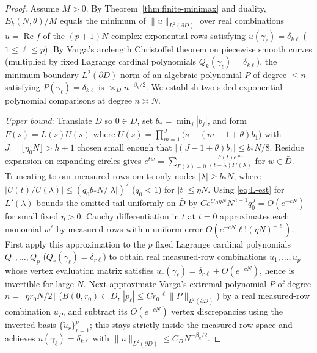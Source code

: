 \documentclass[11pt,reqno]{amsart}
\theoremstyle{definition}
\theoremstyle{remark}
\begin{document}
\begin{proof}
Assume $M > 0$. By Theorem~\ref{thm:finite-minimax} and duality, $E_k(N,\theta)/M$ equals the minimum of $\|u\|_{L^2(\partial D)}$ over real combinations $u = \operatorname{Re} f$ of the $(p+1)N$ complex exponential rows satisfying $u(\gamma_\ell) = \delta_{k\ell}$ ($1 \le \ell \le p$). By Varga's arclength Christoffel theorem on piecewise smooth curves \cite[Theorem~2.4, Corollary~3.7]{Varga2013} (multiplied by fixed Lagrange cardinal polynomials $Q_k(\gamma_\ell) = \delta_{k\ell}$), the minimum boundary $L^2(\partial D)$ norm of an algebraic polynomial $P$ of degree $\le n$ satisfying $P(\gamma_\ell) = \delta_{k\ell}$ is $\asymp_D n^{-\beta_k/2}$. We establish two-sided exponential-polynomial comparisons at degree $n \asymp N$.

\emph{Upper bound}: Translate $D$ so $0 \in D$, set $b_* = \min_j |b_j|$, and form $F(s) = L(s) U(s)$ where $U(s) = \prod_{m=1}^J \bigl(s - (m-1+\theta)b_1\bigr)$ with $J = \lfloor \eta_0 N \rfloor > h + 1$ chosen small enough that $|(J-1+\theta)b_1| \le b_* N / 8$. Residue expansion on expanding circles gives $e^{tw} = \sum_{F(\lambda)=0} \frac{F(t)e^{\lambda w}}{(t-\lambda)F'(\lambda)}$ for $w \in \bar D$. Truncating to our measured rows omits only nodes $|\lambda| \ge b_* N$, where $|U(t)/U(\lambda)| \le (q_0 b_* N / |\lambda|)^J$ ($q_0 < 1$) for $|t| \le \eta N$. Using \eqref{eq:L-est} for $L'(\lambda)$ bounds the omitted tail uniformly on $\bar D$ by $C e^{C_D \eta N} N^{h+1} q_0^J = O(e^{-c N})$ for small fixed $\eta > 0$. Cauchy differentiation in $t$ at $t = 0$ approximates each monomial $w^\ell$ by measured rows within uniform error $O(e^{-c N} \ell! (\eta N)^{-\ell})$. First apply this approximation to the $p$ fixed Lagrange cardinal polynomials $Q_1,\dots,Q_p$ ($Q_r(\gamma_\ell) = \delta_{r\ell}$) to obtain real measured-row combinations $\widetilde u_1,\dots,\widetilde u_p$ whose vertex evaluation matrix satisfies $\widetilde u_r(\gamma_\ell) = \delta_{r\ell} + O(e^{-cN})$, hence is invertible for large $N$. Next approximate Varga's extremal polynomial $P$ of degree $n = \lfloor \eta r_0 N / 2 \rfloor$ ($B(0,r_0) \subset D$, $|p_\ell| \le C r_0^{-\ell}\|P\|_{L^2(\partial D)}$) by a real measured-row combination $u_P$, and subtract its $O(e^{-cN})$ vertex discrepancies using the inverted basis $\{\widetilde u_r\}_{r=1}^p$; this stays strictly inside the measured row space and achieves $u(\gamma_\ell) = \delta_{k\ell}$ with $\|u\|_{L^2(\partial D)} \le C_D N^{-\beta_k/2}$.


\end{proof}
\end{document}
